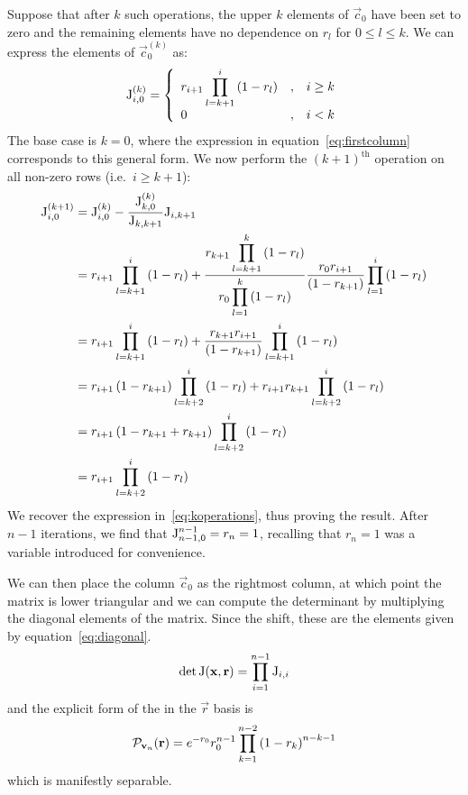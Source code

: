 Suppose that after \(k\) such operations, the upper \(k\) elements of
\(\vec{c}_{0}\) have been set to zero and the remaining elements have no
dependence on \(r_{l}\) for \(0 \leq l \leq k\). We can express the elements of
\(\vec{c}_{0}^{\left(k\right)}\) as:
\begin{equation}
  \label{eq:koperations}
  \mathrm{J}_{i,0}^{\left(k\right)} = \left\{ \begin{array}{lcl}
    r_{i+1} \displaystyle \prod_{l=k+1}^{i} \left( 1-r_{l} \right) & , &
      i \geq k \\
    0 & , & i < k
  \end{array} \right.
\end{equation}
The base case is \(k=0\), where the expression in equation~\ref{eq:firstcolumn}
corresponds to this general form. We now perform the \(\left(k+1\right)^{
\text{th}}\) operation on all non-zero rows (i.e.\ \(i \geq k+1\)):
\begin{align}
  \mathrm{J}_{i,0}^{\left(k+1\right)} &= \mathrm{J}_{i,0}^{\left(k\right)} - 
    \frac{\mathrm{J}_{k,0}^{\left(k\right)}}{\mathrm{J}_{k,k+1}} \mathrm{J}_{i,k+1} \\
  &= r_{i+1}\prod_{l=k+1}^{i} \left( 1-r_{l} \right) + \frac{\displaystyle
    r_{k+1} \prod_{
    l=k+1}^{k} \left( 1-r_{l} \right) }{\displaystyle r_{0} \prod_{l=1}^{k}
    \left( 1-r_{l} \right) } \frac{ r_{0} r_{i+1} }{ \left( 1-r_{k+1} \right) }
    \prod_{ l=1 }^{i} \left( 1-r_{l} \right) \\
  &= r_{i+1} \prod_{l=k+1}^{i} \left( 1-r_{l} \right) + \frac{ r_{k+1} r_{i+1}
    }{ \left( 1-r_{k+1} \right) } \prod_{l=k+1}^{i} \left( 1-r_{l} \right) \\
  &= r_{i+1} \left( 1-r_{k+1} \right) \prod_{l=k+2}^{i} \left( 1-r_{l} \right)
    + r_{i+1} r_{k+1} \prod_{l=k+2}^{i} \left( 1-r_{l} \right) \\
  &= r_{i+1} \left( 1-r_{k+1}+r_{k+1} \right) \prod_{l=k+2}^{i} \left( 1-r_{l}
    \right) \\
  &= r_{i+1} \prod_{l=k+2}^{i} \left( 1-r_{l} \right)
\end{align}
We recover the expression in~\ref{eq:koperations}, thus proving the result.
After \(n-1\) iterations, we find that \(\mathrm{J}_{n-1,0}^{n-1}=r_{n}=1\),
recalling that \(r_{n}=1\) was a variable introduced for convenience.

We can then place the column \(\vec{c}_{0}\) as the rightmost column, at which
point the matrix is lower triangular and we can compute the determinant by
multiplying the diagonal elements of the matrix. Since the shift, these are the
elements given by equation~\ref{eq:diagonal}.
\begin{equation}
  \det \mathrm{J} \!\left( \mathbf{x}, \mathbf{r} \right) = \prod_{i=1}^{n-1} \mathrm{J}_{i,i}
\end{equation}
and the explicit form of the \pdf{} in the \(\vec{r}\) basis is
\begin{equation}
  \mathcal{P}_{\mathbf{v}_n} \!\left( \mathbf{r} \right) = e^{-r_0} r_0^{n-1} \prod_{k=1}^{n-2}
  \left( 1-r_k \right)^{n-k-1}
\end{equation}
which is manifestly separable.

